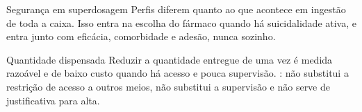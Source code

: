 \begin{frame}{}
\begin{caixafarmaco}{Seguran\c{c}a em superdosagem}
Perfis diferem quanto ao que acontece em ingest\~ao de toda a caixa. Isso entra
na escolha do f\'armaco quando h\'a suicidalidade ativa, e entra junto com
efic\'acia, comorbidade e ades\~ao, nunca sozinho.
\end{caixafarmaco}

\CRvg
\begin{caixafarmaco}{Quantidade dispensada}
Reduzir a quantidade entregue de uma vez \'e medida razo\'avel e de baixo custo
quando h\'a acesso e pouca supervis\~ao. :
n\~ao substitui a restri\c{c}\~ao de acesso a outros meios, n\~ao substitui a
supervis\~ao e n\~ao serve de justificativa para alta.
\end{caixafarmaco}

\CRvg
\begin{center}
\end{center}
\end{frame}

